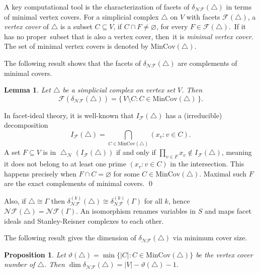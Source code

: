 \documentclass[12pt]{article}
\renewenvironment{proof}{{\noindent\bfseries Proof.}}{\qed}
\theoremstyle{plain}
\newtheorem{proposition}[theorem]{Proposition}
\newtheorem{lemma}[theorem]{Lemma}
\theoremstyle{definition}
\newcommand{\F}{\mathcal{F}}
\newcommand{\IF}{I_{\F}}
\newcommand{\MIN}{\mathrm{MinCov}}
\newcommand{\V}{V}
\begin{document}
	\medskip
	A key computational tool is the characterization of facets of $\delta_{\mathcal{NF}}(\bigtriangleup)$ in terms of minimal vertex covers.
		For a simplicial complex $\bigtriangleup$ on $\V$ with facets $\F(\bigtriangleup)$, a \emph{vertex cover} of $\bigtriangleup$ is a subset $C\subseteq \V$, if $C\cap F\neq\varnothing$, for every $F\in\F(\bigtriangleup)$. If it has no proper subset that is also a vertex cover, then it is \emph{minimal vertex cover}.
		 The set of minimal vertex covers is denoted by $\MIN(\bigtriangleup)$.

\medskip
	The following result shows that the facets of $\delta_{\mathcal{NF}}(\bigtriangleup)$ are complements of minimal covers.
	\begin{lemma}\label{lem:facets-complements}
		Let $\bigtriangleup$ be a simplicial complex on vertex set $\V$. Then
		\[
		\F(\delta_{\mathcal{NF}}(\bigtriangleup)) = \{\,\V\setminus C  : C\in \MIN(\bigtriangleup)\,\}.
		\]
	\end{lemma}
	
	\begin{proof}
		In facet-ideal theory, it is well-known that $\IF(\bigtriangleup)$ has a (irreducible) decomposition \cite[p. 12]{HerzogHibi2011}
		\[
		\IF(\bigtriangleup) = \bigcap_{C\in\MIN(\bigtriangleup)} (x_v : v\in C).
		\]
		A set $F\subseteq\V$ is in $\bigtriangleup_{\mathcal{N}}(\IF(\bigtriangleup))$ if and only if $\prod_{v\in F}x_v \notin \IF(\bigtriangleup)$, meaning it does not belong to at least one prime $(x_v:v\in C)$ in the intersection. This happens precisely when $F\cap C=\varnothing$ for some $C\in\MIN(\bigtriangleup)$. 
		Maximal such $F$ are the exact complements of minimal covers.
	\end{proof}
	
	\medskip
	Also, if $\bigtriangleup\cong\varGamma$ then $\delta_{\mathcal{NF}}^{(k)}(\bigtriangleup)\cong\delta_{\mathcal{NF}}^{(k)}(\varGamma)$ for all $k$, hence $\mathcal{NF}(\bigtriangleup)=\mathcal{NF}(\varGamma)$. An isomorphism renames variables in $S$ and maps facet ideals and Stanley-Reisner complexes to each other.
	
	\medskip
	The following result gives the dimension of $\delta_{\mathcal{NF}}(\bigtriangleup)$  via minimum cover size.
	\begin{proposition}\label{prop:dim}
		Let $\vartheta(\bigtriangleup)=\min\{|C|:C\in\MIN(\bigtriangleup)\}$ be the vertex cover number of $\bigtriangleup$.
		Then $\dim \delta_{\mathcal{NF}}(\bigtriangleup) = |\V|-\vartheta(\bigtriangleup)-1.$ 
	\end{proposition}
	
\end{document}
